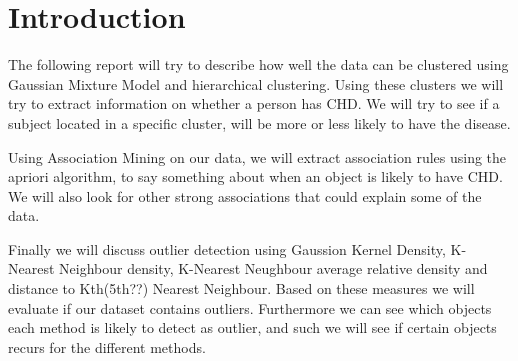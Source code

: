 \section{Introduction}
The following report will try to describe how well the data can be clustered using Gaussian Mixture Model and hierarchical clustering. Using these clusters we will try to extract information on whether a person has CHD. We will try to see if a subject located in a specific cluster, will be more or less likely to have the disease.

Using Association Mining on our data, we will extract association rules using the apriori algorithm, to say something about when an object is likely to have CHD. We will also look for other strong associations that could explain some of the data.

Finally we will discuss outlier detection using Gaussion Kernel Density, K-Nearest Neighbour density, K-Nearest Neughbour average relative density and distance to Kth(5th??) Nearest Neighbour. Based on these measures we will evaluate if our dataset contains outliers. Furthermore we can see which objects each method is likely to detect as outlier, and such we will see if certain objects recurs for the different methods.


